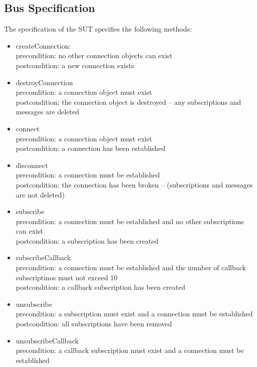 \documentclass{article}
\begin{document}
\newpage
\begin{appendices}

\section{Bus Specification}
\label{app:bus_spec}

The specification of the SUT specifies the following methods:
\begin{itemize}
	\item createConnection:
	\\	precondition:  no other connection objects can exist
	\\	postcondition: a new connection exists
	\item destroyConnection
	\\	precondition:  a connection object must exist
	\\	postcondition: the connection object is destroyed -- any subscriptions and messages are deleted
	\item connect
	\\	precondition:  a connection object must exist
	\\	postcondition: a connection has been established
	\item disconnect
	\\	precondition:  a connection must be established
	\\	postcondition: the connection has been broken -- (subscriptions and messages are not deleted)
	\item subscribe
	\\	precondition:  a connection must be established and no other subscriptions can exist
	\\	postcondition: a subscription has been created
	\item subscribeCallback
	\\	precondition:  a connection must be established and the number of callback subscriptinos must not exceed 10
	\\	postcondition: a callback subscription has been created
	\item unsubscribe
	\\	precondition:  a subscription must exist and a connection must be established
	\\	postcondition: all subscriptions have been removed
	\item unsubscribeCallback
	\\	precondition:  a callback subscription must exist and a connection must be established

\end{itemize}
\end{appendices}
\end{document}
